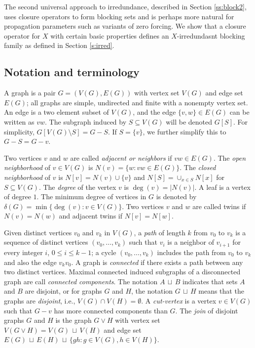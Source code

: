\documentclass{article}
\numberwithin{figure}{section}
\numberwithin{table}{section}
\numberwithin{equation}{section}
\theoremstyle{definition}
\theoremstyle{definition}
\theoremstyle{definition}
\newcommand {\du} {\,\sqcup\,}
\begin{document}
The second universal approach to irredundance, described in Section \ref{ss:block2}, uses closure operators to form blocking sets and  is perhaps more natural for propagation parameters such as variants of zero forcing.  We show that a closure operator for $X$ with certain basic properties defines an $X$-irredundasnt blocking family as defined in Section \ref{s:irred}.






\subsection{Notation and terminology}\label{ss:term}





  A graph is a pair $G=(V(G),E(G))$ with vertex set $V(G)$ and edge set $E(G)$; all graphs are simple, undirected and finite with a nonempty vertex set. An edge is a two element subset of $V(G)$, and the edge $\{v,w\} \in E(G)$ can be written as $vw$. The subgraph induced by $S \subseteq V(G)$ will be denoted $G[S]$. For simplicity, $G[V(G)\setminus S] = G-S$. If $S = \{v\}$,  we further simplify this to $G-S = G-v$.

Two vertices $v$ and $w$ are called \emph{adjacent or neighbors} if $vw \in E(G)$. The \emph{open neighborhood} of $v \in V(G)$ is $N(v)=\{w:vw \in E(G)\}$. The \emph{closed neighborhood} of $v$ is $N[v]=N(v) \cup \{v\}$ and $N[S]=\cup_{x\in S} N[x]$ for $S\subseteq V(G)$. The \emph{degree} of the vertex $v$ is $\deg(v)=|N(v)|$. A leaf is a vertex of degree $1$. The  minimum degree of vertices in $G$ is denoted by $\delta(G)=\min\{\deg(v):v \in V(G)\}$. Two vertices $v$ and $w$ are called twins if $N(v)=N(w)$ and adjacent twins if $N[v]=N[w]$. 

Given distinct vertices $v_0$ and $v_k$ in $V(G)$,  a \emph{path} of length $k$  from $v_0$ to $v_k$ is a sequence of distinct vertices $(v_0,\ldots, v_k)$ such that 
$v_i$ is a neighbor of $v_{i+1}$ for every integer $i$, $0\leq i\leq k -1$; a cycle $(v_0, \dots, v_k)$ includes the path from $v_0$ to $v_k$ and also the edge $v_kv_0$. A graph is \emph{connected} if there exists a path between any two distinct vertices. Maximal connected induced subgraphs of a disconnected graph are call \emph{connected components}.   The notation $A\du B$ indicates that sets $A$ and $B$ are disjoint, or for   graphs $G$ and $H$, 
the notation $G\du H$ means that the graphs are \emph{disjoint}, i.e., $V(G)\cap V(H)=\emptyset$. 
A \emph{cut-vertex} is a vertex $v \in V(G)$ such that $G-v$ has more connected components than $G$. The \emph{join} of disjoint graphs $G$ and $H$ is the graph $G \vee H$ with vertex set $V(G \vee H)=V(G) \du V(H)$ and edge set $E(G) \du E(H) \du \{ gh:g \in V(G), h \in V(H)\}$. 
\end{document}

